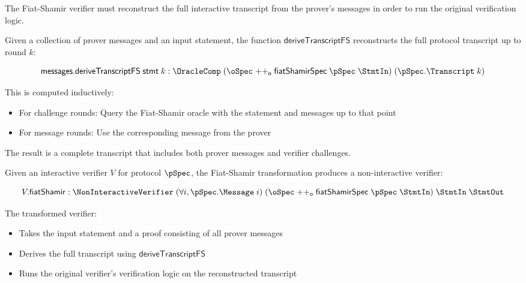 The Fiat-Shamir verifier must reconstruct the full interactive transcript from the prover's messages in order to run the original verification logic.

\begin{definition}
    \label{def:derive_transcript_fs}
    Given a collection of prover messages and an input statement, the function $\mathsf{deriveTranscriptFS}$ reconstructs the full protocol transcript up to round $k$:

    \[ \mathsf{messages}.\mathsf{deriveTranscriptFS} \;\mathsf{stmt} \;k : \OracleComp \;(\oSpec \mathrel{++_\mathsf{o}} \mathsf{fiatShamirSpec} \;\pSpec \;\StmtIn) \;(\pSpec.\Transcript \;k) \]

    This is computed inductively:
    \begin{itemize}
        \item For challenge rounds: Query the Fiat-Shamir oracle with the statement and messages up to that point
        \item For message rounds: Use the corresponding message from the prover
    \end{itemize}

    The result is a complete transcript that includes both prover messages and verifier challenges.
\end{definition}

\begin{definition}
    \label{def:verifier_fiat_shamir}
    Given an interactive verifier $V$ for protocol $\pSpec$, the Fiat-Shamir transformation produces a non-interactive verifier:

    \[ V.\mathsf{fiatShamir} : \NonInteractiveVerifier \;(\forall i, \pSpec.\Message \;i) \;(\oSpec \mathrel{++_\mathsf{o}} \mathsf{fiatShamirSpec} \;\pSpec \;\StmtIn) \;\StmtIn \;\StmtOut \]

    The transformed verifier:
    \begin{itemize}
        \item Takes the input statement and a proof consisting of all prover messages
        \item Derives the full transcript using $\mathsf{deriveTranscriptFS}$
        \item Runs the original verifier's verification logic on the reconstructed transcript
    \end{itemize}
\end{definition}

